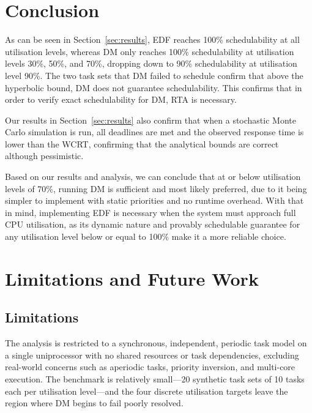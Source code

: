 \documentclass[a4paper,11pt]{article}
\begin{document}
\section{Conclusion}
\label{sec:conclusion}

As can be seen in Section~\ref{sec:results}, EDF reaches 100\% schedulability at all
utilisation levels, whereas DM only reaches 100\% schedulability at utilisation levels
30\%, 50\%, and 70\%, dropping down to 90\% schedulability at utilisation level 90\%.
The two task sets that DM failed to schedule confirm that above the hyperbolic bound,
DM does not guarantee schedulability. This confirms that in order to verify exact
schedulability for DM, RTA is necessary.

Our results in Section~\ref{sec:results} also confirm that when a stochastic Monte Carlo
simulation is run, all deadlines are met and the observed response time is lower than the
WCRT, confirming that the analytical bounds are correct although pessimistic.

Based on our results and analysis, we can conclude that at or below utilisation levels of
70\%, running DM is sufficient and most likely preferred, due to it being simpler to
implement with static priorities and no runtime overhead. With that in mind, implementing
EDF is necessary when the system must approach full CPU utilisation, as its dynamic
nature and provably schedulable guarantee for any utilisation level below or equal to
100\% make it a more reliable choice.

\section{Limitations and Future Work}
\label{sec:limitations}

\subsection{Limitations}

The analysis is restricted to a synchronous, independent, periodic task model on a
single uniprocessor with no shared resources or task dependencies, excluding
real-world concerns such as aperiodic tasks, priority inversion, and multi-core
execution. The benchmark is relatively small---20 synthetic task sets of 10 tasks
each per utilisation level---and the four discrete utilisation targets leave the
region where DM begins to fail poorly resolved.
\end{document}
